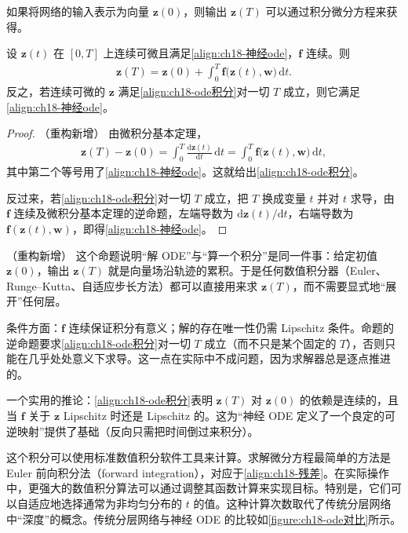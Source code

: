 \documentclass[../../main.tex]{subfiles}
\begin{document}
如果将网络的输入表示为向量 $\bm{z}(0)$，则输出 $\bm{z}(T)$ 可以通过积分微分方程来获得。

\begin{proposition}\label{proposition:ch18-ode积分}
设 $\bm{z}(t)$ 在 $[0,T]$ 上连续可微且满足\eqref{align:ch18-神经ode}，$\bm{f}$ 连续。则
\begin{align}
  \bm{z}(T)=\bm{z}(0)+\int_{0}^{T}\bm{f}\big(\bm{z}(t),\bm{w}\big)\,\mathrm{d}t.\label{align:ch18-ode积分}
\end{align}
反之，若连续可微的 $\bm{z}$ 满足\eqref{align:ch18-ode积分}对一切 $T$ 成立，则它满足\eqref{align:ch18-神经ode}。
\end{proposition}

\begin{proof}（重构新增）
由微积分基本定理，
\begin{align*}
  \bm{z}(T)-\bm{z}(0)=\int_{0}^{T}\frac{\mathrm{d}\bm{z}(t)}{\mathrm{d}t}\,\mathrm{d}t=\int_{0}^{T}\bm{f}\big(\bm{z}(t),\bm{w}\big)\,\mathrm{d}t,
\end{align*}
其中第二个等号用了\eqref{align:ch18-神经ode}。这就给出\eqref{align:ch18-ode积分}。

反过来，若\eqref{align:ch18-ode积分}对一切 $T$ 成立，把 $T$ 换成变量 $t$ 并对 $t$ 求导，由 $\bm{f}$ 连续及微积分基本定理的逆命题，左端导数为 $\mathrm{d}\bm{z}(t)/\mathrm{d}t$，右端导数为 $\bm{f}(\bm{z}(t),\bm{w})$，即得\eqref{align:ch18-神经ode}。
\end{proof}

\begin{remark}（重构新增）
这个命题说明“解 ODE”与“算一个积分”是同一件事：给定初值 $\bm{z}(0)$，输出 $\bm{z}(T)$ 就是向量场沿轨迹的累积。于是任何数值积分器（Euler、Runge--Kutta、自适应步长方法）都可以直接用来求 $\bm{z}(T)$，而不需要显式地“展开”任何层。

条件方面：$\bm{f}$ 连续保证积分有意义；解的存在唯一性仍需 Lipschitz 条件。命题的逆命题要求\eqref{align:ch18-ode积分}对一切 $T$ 成立（而不只是某个固定的 $T$），否则只能在几乎处处意义下求导。这一点在实际中不成问题，因为求解器总是逐点推进的。

一个实用的推论：\eqref{align:ch18-ode积分}表明 $\bm{z}(T)$ 对 $\bm{z}(0)$ 的依赖是连续的，且当 $\bm{f}$ 关于 $\bm{z}$ Lipschitz 时还是 Lipschitz 的。这为“神经 ODE 定义了一个良定的可逆映射”提供了基础（反向只需把时间倒过来积分）。
\end{remark}

这个积分可以使用标准数值积分软件工具来计算。求解微分方程最简单的方法是 Euler 前向积分法（forward integration），对应于\eqref{align:ch18-残差}。在实际操作中，更强大的数值积分算法可以通过调整其函数计算来实现目标。特别是，它们可以自适应地选择通常为非均匀分布的 $t$ 的值。这种计算次数取代了传统分层网络中“深度”的概念。传统分层网络与神经 ODE 的比较如\cref{figure:ch18-ode对比}所示。
\end{document}
